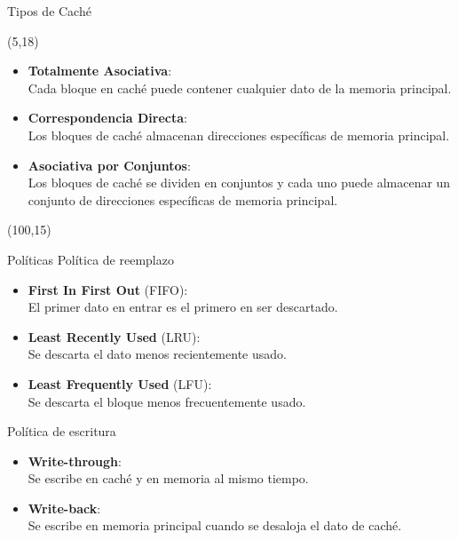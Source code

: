 \documentclass[aspectratio=169]{beamer}
\begin{document}
\begin{frame}{Tipos de Caché}
    \begin{textblock}{80}(5,18)
    \begin{itemize}
    \item<1-> \textbf{Totalmente Asociativa}:\\ Cada bloque en caché puede contener cualquier dato de la memoria principal.\\
    \vskip 15pt
    \item<2-> \textbf{Correspondencia Directa}:\\ Los bloques de caché almacenan direcciones específicas de memoria principal.\\
    \vskip 15pt
    \item<3-> \textbf{Asociativa por Conjuntos}:\\ Los bloques de caché se dividen en conjuntos y cada uno puede almacenar un conjunto de direcciones específicas de memoria principal.\\
    \end{itemize}
    \end{textblock}
    \begin{textblock}{80}(100,15)
    \vspace{1.1cm}
    \vspace{1.1cm}
    \end{textblock}    
\end{frame}

\begin{frame}{Políticas}
    \textcolor{naranjauca}{Política de reemplazo}
    \begin{itemize}
    \item \textbf{First In First Out} (FIFO):\\ El primer dato en entrar es el primero en ser descartado.
    \vskip 5pt
    \item \textbf{Least Recently Used} (LRU):\\ Se descarta el dato menos recientemente usado.
    \vskip 5pt
    \item \textbf{Least Frequently Used} (LFU):\\ Se descarta el bloque menos frecuentemente usado.
    \end{itemize}
    \bigskip
    \pause
    \textcolor{naranjauca}{Política de escritura}
    \begin{itemize}
    \item \textbf{Write-through}:\\ Se escribe en caché y en memoria al mismo tiempo.
    \vskip 5pt
    \item \textbf{Write-back}:\\ Se escribe en memoria principal cuando se desaloja el dato de caché.
    \end{itemize}
\end{frame}
\end{document}
